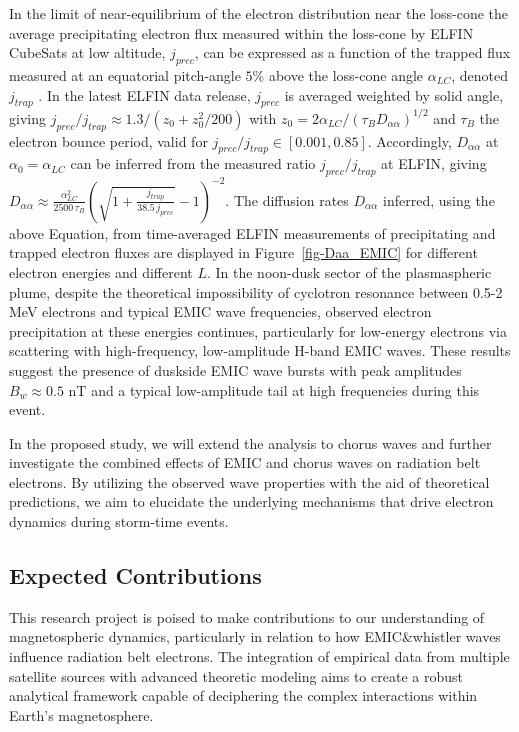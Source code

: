 \documentclass[
  letterpaper,
  DIV=11,
  numbers=noendperiod]{scrartcl}
\begin{document}
In the limit of near-equilibrium of the electron distribution near the loss-cone \citep{kennelLimitStablyTrapped1966} the average precipitating electron flux measured within the loss-cone by ELFIN CubeSats at low altitude, \(j_{prec}\), can be expressed as a function of the trapped flux measured at an equatorial pitch-angle \(5\)\% above the loss-cone angle \(\alpha_{LC}\), denoted \(j_{trap}\) \citep{mourenasUpperLimitOuter2023}. In the latest ELFIN data release, \(j_{prec}\) is averaged weighted by solid angle, giving \(j_{prec}/j_{trap}\approx 1.3/(z_0+z_0^2/200)\) with \(z_0=2\alpha_{LC}/(\tau_B D_{\alpha\alpha})^{1/2}\) and \(\tau_B\) the electron bounce period, valid for \(j_{prec}/j_{trap}\in[0.001,0.85]\).
Accordingly, \(D_{\alpha\alpha}\) at \(\alpha_0=\alpha_{LC}\) can be inferred from the measured ratio \(j_{prec}/j_{trap}\) at ELFIN, giving \(D_{\alpha\alpha} \approx \frac{{\alpha_{LC}^2}}{{2500\, \tau_B }} \left(\sqrt{1+ \frac{{ j_{trap} }}{{ 38.5\, j_{prec} }} } -1 \right)^{-2}\).
The diffusion rates \(D_{\alpha\alpha}\) inferred, using the above Equation, from time-averaged ELFIN measurements of precipitating and trapped electron fluxes are displayed in Figure~\ref{fig-Daa_EMIC} for different electron energies and different \(L\). In the noon-dusk sector of the plasmaspheric plume, despite the theoretical impossibility of cyclotron resonance between 0.5-2 MeV electrons and typical EMIC wave frequencies, observed electron precipitation at these energies continues, particularly for low-energy electrons via scattering with high-frequency, low-amplitude H-band EMIC waves.
These results suggest the presence of duskside EMIC wave bursts with peak amplitudes \(B_w\approx 0.5\) nT and a typical low-amplitude tail at high frequencies during this event.

In the proposed study, we will extend the analysis to chorus waves and further investigate the combined effects of EMIC and chorus waves on radiation belt electrons. By utilizing the observed wave properties with the aid of theoretical predictions, we aim to elucidate the underlying mechanisms that drive electron dynamics during storm-time events.

\subsection{Expected Contributions}\label{expected-contributions}

This research project is poised to make contributions to our understanding of magnetospheric dynamics, particularly in relation to how EMIC\&whistler waves influence radiation belt electrons. The integration of empirical data from multiple satellite sources with advanced theoretic modeling aims to create a robust analytical framework capable of deciphering the complex interactions within Earth's magnetosphere.
\end{document}
